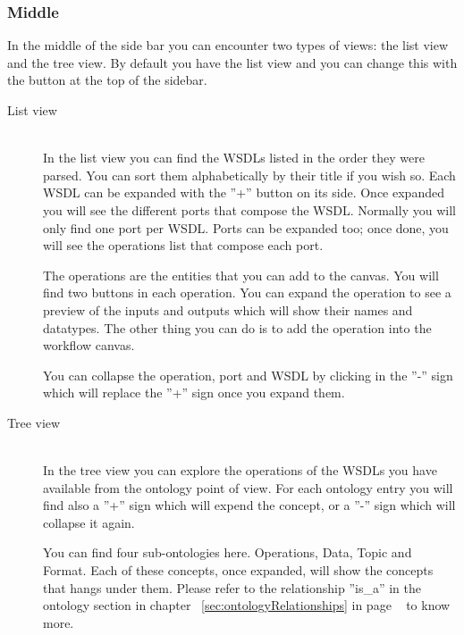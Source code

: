 \documentclass[a4paper,10pt]{article}
\begin{document}
    \subsubsection{Middle}

    In the middle of the side bar you can encounter two types of views: the list view and the tree view. By default you have the list view and you can change this with the button at the top of the sidebar.

    \begin{description}
    \item[List view] \hfill \\
    In the list view you can find the WSDLs listed in the order they were parsed. You can sort them alphabetically by their title if you wish so. Each WSDL can be expanded with the ''+'' button on its side. Once expanded you will see the different ports that compose the WSDL. Normally you will only find one port per WSDL. Ports can be expanded too; once done, you will see the operations list that compose each port.\vspace{3 mm}

    The operations are the entities that you can add to the canvas. You will find two buttons in each operation. You can expand the operation to see a preview of the inputs and outputs which will show their names and datatypes. The other thing you can do is to add the operation into the workflow canvas.\vspace{3 mm}

    You can collapse the operation, port and WSDL by clicking in the ''-'' sign which will replace the ''+'' sign once you expand them.

    \item[Tree view] \hfill \\
    In the tree view you can explore the operations of the WSDLs you have available from the ontology point of view. For each ontology entry you will find also a ''+'' sign which will expend the concept, or a ''-'' sign which will collapse it again.\vspace{3 mm}

    You can find four sub-ontologies here. Operations, Data, Topic and Format. Each of these concepts, once expanded, will show the concepts that hangs under them. Please refer to the relationship ''is\_a'' in the ontology section in chapter ~\ref{sec:ontologyRelationships} in page ~\pageref{sec:ontologyRelationships} to know more.\vspace{3 mm}


\end{description}
\end{document}
